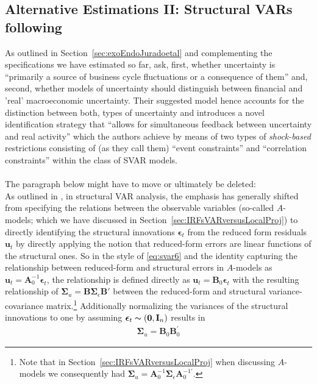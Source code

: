 \documentclass[a4paper,11pt,listof=nochaptergap,oneside,pointednumbers,bibtotoc,bigheadings,liststotoc]{scrbook}
\theoremstyle{mysatz}
\theoremstyle{mydefinition}
\theoremstyle{mybemerkung}
\newcommand{\vect}[1]{\boldsymbol{\mathbf{#1}}}
\begin{document}
\begin{itemize}
\section{Alternative Estimations II: Structural VARs following \citet{ludvigsonetal:18}}
\label{sec:ludvigsonetal18}
As outlined in Section~\ref{sec:exoEndoJuradoetal} and complementing the specifications we have estimated so far, \citet[p. 2]{ludvigsonetal:18} ask, first, whether uncertainty is ``primarily a source of business cycle fluctuations or a consequence of them'' and, second, whether models of uncertainty should distinguish between financial and 'real' macroeconomic uncertainty. Their suggested model hence accounts for the distinction between both, types of uncertainty and introduces a novel identification strategy that ``allows for simultaneous feedback between uncertainty and real activity'' which the authors achieve by means of two types of \textit{shock-based} restrictions consisting of (as they call them) ``event constraints'' and ``correlation constraints'' within the class of SVAR models.\\
\\
The paragraph below might have to move or ultimately be deleted:\\
As outlined in \citet{lutkepohl:05}, in structural VAR analysis, the emphasis has generally shifted from specifying the relations between the observable variables (so-called $A$-models; which we have discussed in Section~\ref{sec:IRFsVARversusLocalProj}) to directly identifying the structural innovations $\vect{\epsilon}_t$ from the reduced form residuals $\vect{u}_t$ by directly applying the notion that reduced-form errors are linear functions of the structural ones. So in the style of \ref{eq:svar6} and the identity capturing the relationship between reduced-form and structural errors in $A$-models as $\vect{u}_t = \vect{A}_0^{-1}\vect{\epsilon}_t$, the relationship is defined directly as $\vect{u}_t = \vect{B}_0\vect{\epsilon}_t$ with the resulting relationship of $\vect{\Sigma}_u = \vect{B}\vect{\Sigma}_\epsilon\vect{B}'$ between the reduced-form and structural variance-covariance matrix.\footnote{Note that in Section~\ref{sec:IRFsVARversusLocalProj} when discussing $A$-models we consequently had $\vect{\Sigma}_u = \vect{A}_0^{-1}\vect{\Sigma}_\epsilon\vect{A}_0^{-1'}$.} Additionally normalizing the variances of the structural innovations to one by assuming $\vect{\epsilon}_t  \thicksim (\vect{0}, \vect{I}_n)$ results in 
	\begin{equation} \label{eq:svar_ludvig2}
	\begin{split}
		\vect{\Sigma}_u = \vect{B}_0 \vect{B}_0^'
	\end{split}
	\end{equation}


\end{itemize}
\end{document}
